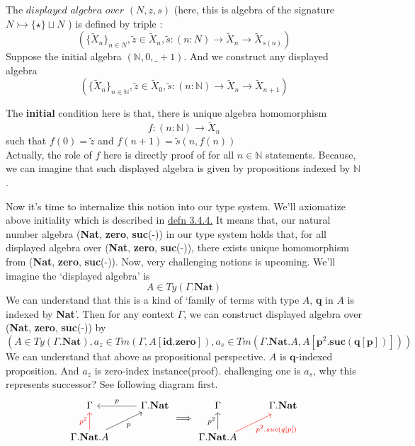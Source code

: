\documentclass[12pt, a4paper, openany, twoside]{book}
\theoremstyle{definition}
\theoremstyle{remark}
\theoremstyle{plain}
\numberwithin{equation}{section}
\begin{document}
\begin{tcolorbox}[breakable, colback=yellow!10!white,colframe=green!75!black,title=Definition 3.4.4.]\hypertarget{defn 3.4.4.}{}
The $displayed$ $algebra$ $over$ $(N, z, s)$ (here, this is algebra of the signature $N \rightarrowtail \{\star\} \sqcup N$ ) is defined by triple : 
\[(\{\tilde{X}_n\}_{n \in N}, \tilde{z} \in \tilde{X}_n, \tilde{s} : (n : N) \rightarrow \tilde{X}_n \rightarrow \tilde{X}_{s(n)})\]
Suppose the initial algebra $(\mathbb{N}, 0, \_ + 1)$. And we construct any displayed algebra 
\[\left( \{\tilde{X}_n\}_{n \in \mathbb{N}}, \tilde{z} \in \tilde{X}_0, \tilde{s} : (n : \mathbb{N}) \rightarrow \tilde{X}_n \rightarrow \tilde{X}_{n+1} \right) \]

The \textbf{initial} condition here is that, there is unique algebra homomorphism 
\[f : (n : \mathbb{N}) \rightarrow \tilde{X}_n\]
such that $f(0) = \tilde{z}$ and $f(n+1) = \tilde{s}(n, f(n))$
\\
Actually, the role of $f$ here is directly proof of for all $n \in \mathbb{N}$ statements. 
Because, we can imagine that such displayed algebra is given by propositions indexed by $\mathbb{N}$. 
\end{tcolorbox}
\noindent Now it's time to internalize this notion into our type system. 
We'll axiomatize above initiality which is described in \hyperlink{defn 3.4.4.}{defn 3.4.4.}
It means that, our natural number algebra (\textbf{Nat}, \textbf{zero}, \textbf{suc}(-)) in our type system 
holds that, for all displayed algebra over (\textbf{Nat}, \textbf{zero}, \textbf{suc}(-)), there exists unique homomorphism from (\textbf{Nat}, \textbf{zero}, \textbf{suc}(-)). 
Now, very challenging notions is upcoming. We'll imagine the \lq displayed algebra' is 
\[A \in Ty(\Gamma.\mathbf{Nat})\]
We can understand that this is a kind of \lq family of terms with type $A$, \textbf{q} in $A$ is indexed by \textbf{Nat}'. 
Then for any context $\Gamma$, we can construct displayed algebra over (\textbf{Nat}, \textbf{zero}, \textbf{suc}(-)) by 
\[\left(A \in Ty(\Gamma.\mathbf{Nat}), a_z \in Tm(\Gamma, A[\mathbf{id.zero}]), a_s \in Tm(\Gamma.\mathbf{Nat}.A, A[\mathbf{p}^2.\mathbf{suc}(\mathbf{q}[\mathbf{p}])])\right)\]
We can understand that above as propositional perspective. $A$ is $\mathbf{q}$-indexed proposition. 
And $a_z$ is zero-index instance(proof). challenging one is $a_s$, why this represents successor? 
See following diagram first. 
\[
\begin{tikzcd}
    \Gamma & \Gamma.\mathbf{Nat} \arrow[l, "p"']\\
    \Gamma.\mathbf{Nat}.A \arrow[ru, "p"'] \arrow[u, red, "p^2"]
\end{tikzcd}
\Longrightarrow
\begin{tikzcd}
    \Gamma & \Gamma.\mathbf{Nat} \\
    \Gamma.\mathbf{Nat}.A \arrow[u, "p^2"] \arrow[shift right, ru, red, "{p^2.suc(q[p])}"']
\end{tikzcd}
\]
\end{document}
